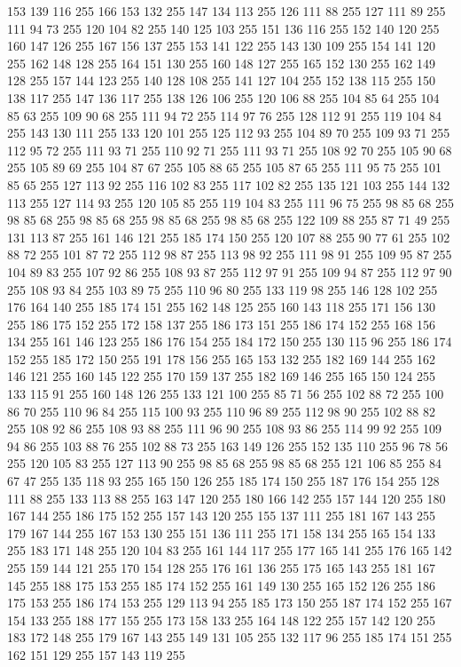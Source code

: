 153 139 116 255 166 153 132 255 147 134 113 255 126 111 88 255 127 111 89 255 111 94 73 255 120 104 82 255 140 125 103 255 151 136 116 255 152 140 120 255 160 147 126 255 167 156 137 255 153 141 122 255 143 130 109 255 154 141 120 255 162 148 128 255 164 151 130 255 160 148 127 255 165 152 130 255 162 149 128 255 157 144 123 255 140 128 108 255 141 127 104 255 152 138 115 255 150 138 117 255 147 136 117 255 138 126 106 255 120 106 88 255 104 85 64 255 104 85 63 255 109 90 68 255 111 94 72 255 114 97 76 255 128 112 91 255 119 104 84 255 143 130 111 255 133 120 101 255 125 112 93 255 104 89 70 255 109 93 71 255 112 95 72 255 111 93 71 255 110 92 71 255 111 93 71 255 108 92 70 255 105 90 68 255 105 89 69 255 104 87 67 255 105 88 65 255 105 87 65 255 111 95 75 255 101 85 65 255 127 113 92 255 116 102 83 255 117 102 82 255 135 121 103 255 144 132 113 255 127 114 93 255 120 105 85 255 119 104 83 255 111 96 75 255 98 85 68 255 98 85 68 255 98 85 68 255
98 85 68 255 98 85 68 255 122 109 88 255 87 71 49 255 131 113 87 255 161 146 121 255 185 174 150 255 120 107 88 255 90 77 61 255 102 88 72 255 101 87 72 255 112 98 87 255 113 98 92 255 111 98 91 255 109 95 87 255 104 89 83 255 107 92 86 255 108 93 87 255 112 97 91 255 109 94 87 255 112 97 90 255 108 93 84 255 103 89 75 255 110 96 80 255 133 119 98 255 146 128 102 255 176 164 140 255 185 174 151 255 162 148 125 255 160 143 118 255 171 156 130 255 186 175 152 255 172 158 137 255 186 173 151 255 186 174 152 255 168 156 134 255 161 146 123 255 186 176 154 255 184 172 150 255 130 115 96 255 186 174 152 255 185 172 150 255 191 178 156 255 165 153 132 255 182 169 144 255 162 146 121 255 160 145 122 255 170 159 137 255 182 169 146 255 165 150 124 255 133 115 91 255 160 148 126 255 133 121 100 255 85 71 56 255 102 88 72 255 100 86 70 255 110 96 84 255 115 100 93 255 110 96 89 255 112 98 90 255 102 88 82 255 108 92 86 255 108 93 88 255 111 96 90 255
108 93 86 255 114 99 92 255 109 94 86 255 103 88 76 255 102 88 73 255 163 149 126 255 152 135 110 255 96 78 56 255 120 105 83 255 127 113 90 255 98 85 68 255 98 85 68 255 121 106 85 255 84 67 47 255 135 118 93 255 165 150 126 255 185 174 150 255 187 176 154 255 128 111 88 255 133 113 88 255 163 147 120 255 180 166 142 255 157 144 120 255 180 167 144 255 186 175 152 255 157 143 120 255 155 137 111 255 181 167 143 255 179 167 144 255 167 153 130 255 151 136 111 255 171 158 134 255 165 154 133 255 183 171 148 255 120 104 83 255 161 144 117 255 177 165 141 255 176 165 142 255 159 144 121 255 170 154 128 255 176 161 136 255 175 165 143 255 181 167 145 255 188 175 153 255 185 174 152 255 161 149 130 255 165 152 126 255 186 175 153 255 186 174 153 255 129 113 94 255 185 173 150 255 187 174 152 255 167 154 133 255 188 177 155 255 173 158 133 255 164 148 122 255 157 142 120 255 183 172 148 255 179 167 143 255 149 131 105 255 132 117 96 255 185 174 151 255 162 151 129 255 157 143 119 255
